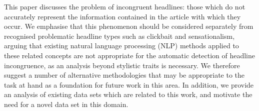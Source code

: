 This paper discusses the problem of incongruent headlines: those which do not accurately represent the information contained in the article with which they occur. We emphasise that this phenomenon should be considered separately from recognised problematic headline types such as clickbait and sensationalism, arguing that existing natural language processing (NLP) methods applied to these related concepts are not appropriate for the automatic detection of headline incongruence, as an analysis beyond stylistic traits is necessary. We therefore suggest a number of alternative methodologies that may be appropriate to the task at hand as a foundation for future work in this area. In addition, we provide an analysis of existing data sets which are related to this work, and motivate the need for a novel data set in this domain.
